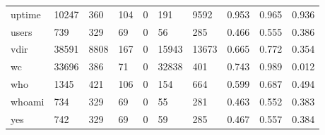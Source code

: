 \begin{longtable}{lp{2.0cm}p{2.0cm}p{2.0cm}p{2.0cm}p{2.0cm}p{2.0cm}p{2.0cm}p{2.0cm}p{2.0cm}}
uptime    &                  10247 &                                360 &                               104 &                                0 &                               191 &                            9592 &                                0.953 &                                  0.965 &                                0.936 \\
users     &                    739 &                                329 &                                69 &                                0 &                                56 &                             285 &                                0.466 &                                  0.555 &                                0.386 \\
vdir      &                  38591 &                               8808 &                               167 &                                0 &                             15943 &                           13673 &                                0.665 &                                  0.772 &                                0.354 \\
wc        &                  33696 &                                386 &                                71 &                                0 &                             32838 &                             401 &                                0.743 &                                  0.989 &                                0.012 \\
who       &                   1345 &                                421 &                               106 &                                0 &                               154 &                             664 &                                0.599 &                                  0.687 &                                0.494 \\
whoami    &                    734 &                                329 &                                69 &                                0 &                                55 &                             281 &                                0.463 &                                  0.552 &                                0.383 \\
yes       &                    742 &                                329 &                                69 &                                0 &                                59 &                             285 &                                0.467 &                                  0.557 &                                0.384 \\
\end{longtable}
